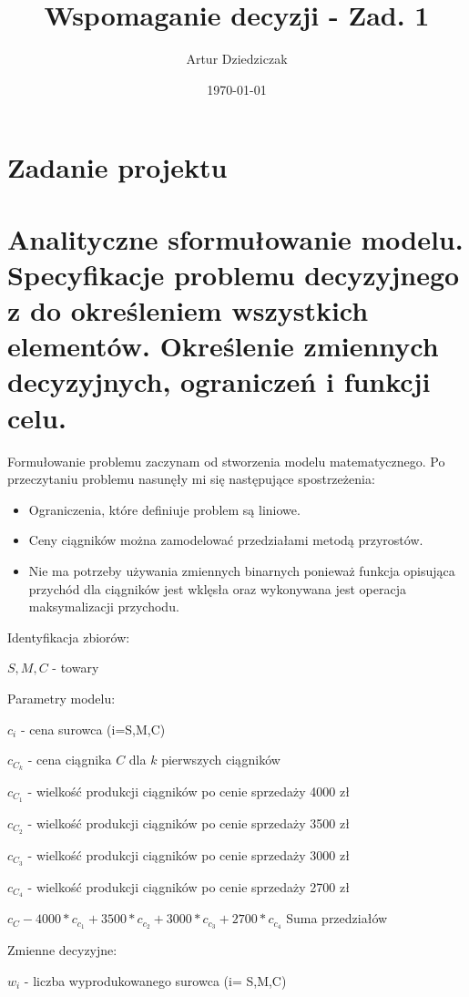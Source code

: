 \documentclass{article}
\title{Wspomaganie decyzji - Zad. 1}
\author{Artur Dziedziczak}
\date{\today}
\begin{document}
\maketitle

\section{Zadanie projektu}

\section{Analityczne sformułowanie modelu. Specyfikacje problemu decyzyjnego z do określeniem wszystkich elementów. Określenie zmiennych decyzyjnych, ograniczeń i funkcji celu.}

Formułowanie problemu zaczynam od stworzenia modelu matematycznego.
Po przeczytaniu problemu nasunęły mi się następujące spostrzeżenia:

\begin{itemize}
	\item Ograniczenia, które definiuje problem są liniowe.
	\item Ceny ciągników można zamodelować przedziałami metodą przyrostów.
	\item Nie ma potrzeby używania zmiennych binarnych ponieważ funkcja opisująca przychód dla ciągników jest wklęsła oraz wykonywana jest operacja maksymalizacji przychodu.
\end{itemize}


Identyfikacja zbiorów: 

${ S, M ,C }$ - towary

Parametry modelu:

$c_i$ - cena surowca (i=S,M,C)

$c_C_k$ - cena ciągnika $C$ dla $k$ pierwszych ciągników

$c_C_1$ - wielkość produkcji ciągników po cenie sprzedaży 4000 zł

$c_C_2$ - wielkość produkcji ciągników po cenie sprzedaży 3500 zł

$c_C_3$ - wielkość produkcji ciągników po cenie sprzedaży 3000 zł

$c_C_4$ - wielkość produkcji ciągników po cenie sprzedaży 2700 zł

$c_C - 4000 * c_c_1 + 3500 * c_c_2 + 3000 * c_c_3 + 2700 * c_c_4$ Suma przedziałów

Zmienne decyzyjne:

$w_i$ - liczba wyprodukowanego surowca (i= S,M,C)
\end{document}
